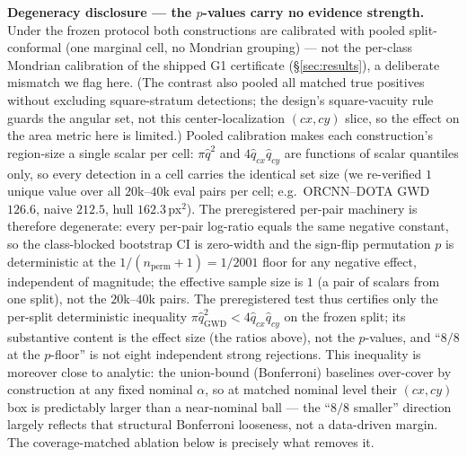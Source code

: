 \documentclass[journal]{IEEEtran}
\begin{document}
\textbf{Degeneracy disclosure --- the $p$-values carry no evidence strength.} Under the frozen protocol
both constructions are calibrated with pooled split-conformal (one marginal cell, no Mondrian
grouping) --- not the per-class Mondrian calibration of the shipped G1
certificate (\S\ref{sec:results}), a deliberate mismatch we flag here. (The contrast also pooled all
matched true positives without excluding square-stratum detections; the design's square-vacuity rule
guards the angular set, not this center-localization $(cx,cy)$ slice, so the effect on the
area metric here is limited.) Pooled calibration makes each
construction's region-size a single scalar per cell: $\pi\hat q^2$ and $4\hat q_{cx}\hat q_{cy}$
are functions of scalar quantiles only, so every detection in a cell carries the identical set
size (we re-verified $1$ unique value over all $20$k--$40$k eval pairs per cell; e.g.\ ORCNN--DOTA GWD
$126.6$, naive $212.5$, hull $162.3$\,px$^2$). The preregistered per-pair machinery is therefore
degenerate: every per-pair log-ratio equals the same negative constant, so the class-blocked
bootstrap CI is zero-width and the sign-flip permutation $p$ is deterministic at the
$1/(n_{\mathrm{perm}}{+}1)=1/2001$ floor for any negative effect, independent of magnitude; the
effective sample size is $1$ (a pair of scalars from one split), not the $20$k--$40$k pairs.
The preregistered test thus certifies only the per-split deterministic inequality
$\pi\hat q_{\mathrm{GWD}}^2 < 4\hat q_{cx}\hat q_{cy}$ on the frozen split; its substantive content is
the effect size (the ratios above), not the $p$-values, and ``$8/8$ at the $p$-floor'' is
not eight independent strong rejections. This inequality is moreover close to analytic: the
union-bound (Bonferroni) baselines over-cover by construction at any fixed nominal $\alpha$, so at matched
nominal level their $(cx,cy)$ box is predictably larger than a near-nominal ball --- the ``$8/8$ smaller''
direction largely reflects that structural Bonferroni looseness, not a data-driven margin. The
coverage-matched ablation below is precisely what removes it.
\end{document}
